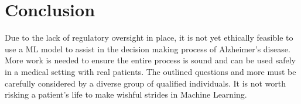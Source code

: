 \documentclass[10pt,twocolumn]{article}
\begin{document}
\section{Conclusion}
Due to the lack of regulatory oversight in place, it is not yet ethically feasible to use a ML model to assist in the decision making process of Alzheimer’s disease. More work is needed to ensure the entire process is sound and can be used safely in a medical setting with real patients. The outlined questions and more must be carefully considered by a diverse group of qualified individuals. It is not worth risking a patient’s life to make wishful strides in Machine Learning. 

\printbibliography 
\end{document}
